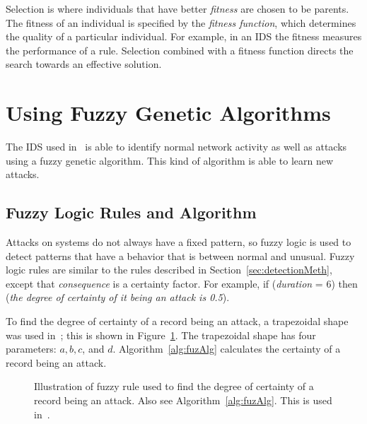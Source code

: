 \documentclass{sig-alternate}
\begin{document}
Selection is where individuals that have better \emph{fitness} are chosen to be parents. The fitness of an individual is specified by the \emph{fitness function}, which determines the quality of a particular individual. For example, in an IDS the fitness measures the performance of a rule. Selection combined with a fitness function directs the search towards an effective solution.~\cite{DBLP:journals/corr/abs-1204-6416}











\section{Using Fuzzy Genetic Algorithms}
\label{sec:fuzGenAlgImp}
The IDS used in~\cite{6496342, 6559603} is able to identify normal network activity as well as attacks using a fuzzy genetic algorithm. This kind of algorithm is able to learn new attacks.




\subsection{Fuzzy Logic Rules and Algorithm}
\label{sec:fuzzyRulesAndAlgorithm}
Attacks on systems do not always have a fixed pattern, so fuzzy logic is used to detect patterns that have a behavior that is between normal and unusual. Fuzzy logic rules are similar to the rules described in Section~\ref{sec:detectionMeth}, except that \emph{consequence} is a certainty factor. For example, if (\emph{duration} = 6) then (\emph{the degree of certainty of it being an attack is 0.5}).

To find the degree of certainty of a record being an attack, a trapezoidal shape was used in~\cite{6496342, 6559603}; this is shown in Figure~\ref{fig:trapFigure}. The trapezoidal shape has four parameters: $a, b, c$, and $d$. Algorithm~\ref{alg:fuzAlg} calculates the certainty of a record being an attack.


\begin{figure}
\caption{Illustration of fuzzy rule used to find the degree of certainty of a record being an attack. Also see Algorithm~\ref{alg:fuzAlg}. This is used in~\cite{6496342, 6559603}.}
\centering
{}
\label{fig:trapFigure}
\end{figure}
\end{document}

